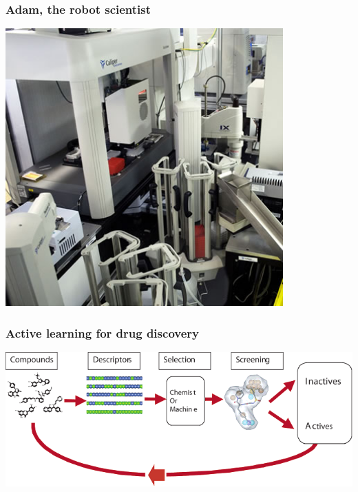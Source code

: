 \documentclass{beamer}
\newcommand{\pnote}[1] {}
\begin{document}
\begin{frame}
  \frametitle{Adam, the robot scientist}
  \centering
  \includegraphics[width=0.8\textwidth]{figures/robot-scientist}
\end{frame}
\pnote{Let's say we want to build a robot scientist and tell it to
discover a cure for cancer. What does the scientist do??}



\begin{frame}
  \frametitle{Active learning for drug discovery}
  \centering
  \includegraphics[width=0.9\columnwidth]{figures/drug-discovery-000}
\end{frame}
\pnote{Simplifying the problem a bit, consider that you have a large
number of drug candidates for cancer and you wish to discover
those that are active against it. The ideas is that you select
some of them, then screen them, to sort them into active and
inactive. However, there are too many drugs to screen, so the
process is interactive. At each cycle, we select some drugs to
screen, classify them, and then use this information to select
more drugs to screen. This cycle, consequently has two parts:
1. Selecting some drugs given our current knowledge.
2. Updating our knowledge given new evidence.}
\end{document}
